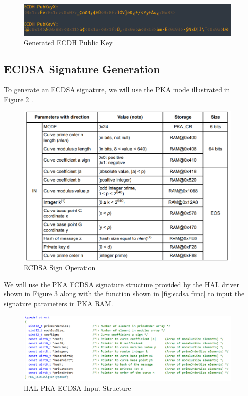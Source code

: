     \begin{figure}[H]
    \centering
    \includegraphics[width=13cm]{img/ecdh pub key.png}
    \caption{Generated ECDH Public Key }
    \label{fig:ecc_pub}
    \end{figure}

\subsection{ECDSA Signature Generation}    

To generate an ECDSA signature, we will use the PKA mode illustrated in Figure \ref{fig:ecdsa_sign_tab} \cite{U5_Refman}.
 \begin{figure}[H]
    \centering
    \includegraphics[width=14cm]{img/ecdsa sign2.png}
    \caption{ECDSA Sign Operation }
    \label{fig:ecdsa_sign_tab}
    \end{figure}

 We will use the PKA ECDSA signature structure provided by the HAL driver shown in Figure \ref{fig:ecdsa struct} along with the function shown in \ref{fig:ecdsa func} to input the signature parameters in PKA RAM.

\begin{figure}[H]
    \centering
    \includegraphics[width=17cm]{img/ecdsa struct.png}
    \caption{HAL PKA ECDSA Input Structure}
    \label{fig:ecdsa struct}
    \end{figure}

